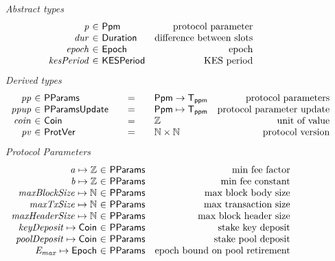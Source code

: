 \begin{figure*}[htb]
  \emph{Abstract types}
  \begin{equation*}
    \begin{array}{r@{~\in~}lr}
      \var{p} & \Ppm & \text{protocol parameter}\\
      \var{dur} & \Duration & \text{difference between slots}\\
      \var{epoch} & \Epoch & \text{epoch} \\
      \var{kesPeriod} & \KESPeriod & \text{KES period} \\
    \end{array}
  \end{equation*}
  \emph{Derived types}
  \begin{equation*}
    \begin{array}{r@{~\in~}l@{\qquad=\qquad}lr}
      \var{pp}
      & \PParams
      & \Ppm \to \mathsf{T_{ppm}}
      & \text{protocol parameters}
      \\
      \var{ppup}
      & \PParamsUpdate
      & \Ppm \mapsto \mathsf{T_{ppm}}
      & \text{protocol parameter update}
      \\
      \var{coin}
      & \Coin
      & \Z
      & \text{unit of value}
      \\
      \var{pv}
      & \ProtVer
      & \N\times\N
      & \text{protocol version}
    \end{array}
  \end{equation*}
  \emph{Protocol Parameters}
  \begin{equation*}
      \begin{array}{r@{~\in~}lr}
        \var{a} \mapsto \Z & \PParams & \text{min fee factor}\\
        \var{b} \mapsto \Z & \PParams & \text{min fee constant}\\
        \var{maxBlockSize} \mapsto \N & \PParams & \text{max block body size}\\
        \var{maxTxSize} \mapsto \N & \PParams & \text{max transaction size}\\
        \var{maxHeaderSize} \mapsto \N & \PParams & \text{max block header size}\\
        \var{keyDeposit} \mapsto \Coin & \PParams & \text{stake key deposit}\\
        \var{poolDeposit} \mapsto \Coin & \PParams & \text{stake pool deposit}\\
        \var{E_{max}} \mapsto \Epoch & \PParams & \text{epoch bound on pool retirement}\\

\end{array}
\end{equation*}
\end{figure*}

